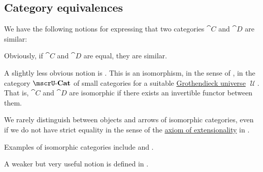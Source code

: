 \subsection{Category equivalences}\label{subsec:category_equivalences}

\begin{remark}\label{rem:category_similarity}
  We have the following notions for expressing that two categories \( \cat{C} \) and \( \cat{D} \) are similar:

  \begin{thmenum}
     Obviously, if \( \cat{C} \) and \( \cat{D} \) are equal, they are similar.

     A slightly less obvious notion is . This is an isomorphism, in the sense of , in the category \hyperref[def:category_of_small_categories]{\( \ucat{Cat} \)} of small categories for a suitable \hyperref[def:grothendieck_universe]{Grothendieck universe} \( \mscrU \). That is, \( \cat{C} \) and \( \cat{D} \) are isomorphic if there exists an invertible functor between them.

    We rarely distinguish between objects and arrows of isomorphic categories, even if we do not have strict equality in the sense of the \hyperref[def:zfc/extensionality]{axiom of extensionality} in \hyperref[def:zfc]{}.

    Examples of isomorphic categories include  and .

     A weaker but very useful notion is  defined in .
  \end{thmenum}
\end{remark}

